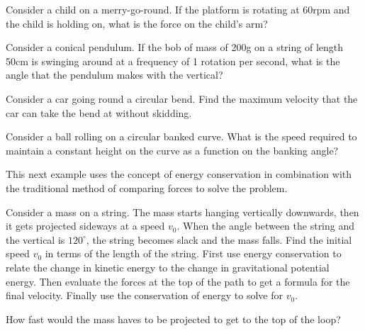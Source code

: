 \documentclass[../classical_mechanics.tex]{subfiles}
\begin{document}
        \begin{example}
            Consider a child on a merry-go-round.
            If the platform is rotating at 60rpm and the child is holding on, what is the force on the child's arm?
        \end{example}
        \begin{example}
            Consider a conical pendulum. 
            If the bob of mass of 200g on a string of length 50cm is swinging around at a frequency of 1 rotation per second, what is the angle that the pendulum makes with the vertical?
        \end{example}
        \begin{example}
            Consider a car going round a circular bend.
            Find the maximum velocity that the car can take the bend at without skidding.
        \end{example}
        \begin{example}
            Consider a ball rolling on a circular banked curve.
            What is the speed required to maintain a constant height on the curve as a function on the banking angle?
        \end{example}
        This next example uses the concept of energy conservation in combination with the traditional method of comparing forces to solve the problem.
        \begin{example}
            Consider a mass on a string.
            The mass starts hanging vertically downwards, then it gets projected sideways at a speed $v_0$.
            When the angle between the string and the vertical is $120^\circ$, the string becomes slack and the mass falls.
            Find the initial speed $v_0$ in terms of the length of the string.
            First use energy conservation to relate the change in kinetic energy to the change in gravitational potential energy.
            Then evaluate the forces at the top of the path to get a formula for the final velocity.
            Finally use the conservation of energy to solve for $v_0$.

            How fast would the mass haves to be projected to get to the top of the loop?
        \end{example}
\end{document}
